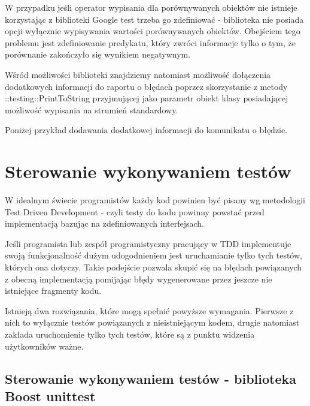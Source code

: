 \documentclass[12pt,a4paper,notitlepage]{report}
\begin{document}
W przypadku jeśli operator wypisania dla porównywanych obiektów nie istnieje korzystając z biblioteki Google test trzeba go zdefiniować - biblioteka nie posiada opcji wyłącznie wypisywania wartości porównywanych obiektów. Obejściem tego problemu jest zdefiniowanie predykatu, który zwróci informacje tylko o tym, że porównanie zakończyło się wynikiem negatywnym.

Wśród możliwości biblioteki znajdziemy natomiast możliwość dołączenia dodatkowych informacji do raportu o błędach poprzez skorzystanie z metody ::testing::PrintToString przyjmującej jako parametr obiekt klasy posiadającej możliwość wypisania na strumień standardowy.

Poniżej przykład dodawania dodatkowej informacji do komunikatu o błędzie.

			

\chapter{Sterowanie wykonywaniem testów}

W idealnym świecie programistów każdy kod powinien być pisany wg metodologii Test Driven Development - czyli testy do kodu powinny powstać przed implementacją bazując na zdefiniowanych interfejsach.

Jeśli programista lub zespół programistyczny pracujący w TDD implementuje swoją funkcjonalność dużym udogodnieniem jest uruchamianie tylko tych testów, których ona dotyczy. Takie podejście pozwala skupić się na błędach powiązanych z obecną implementacją pomijając błędy wygenerowane przez jeszcze nie istniejące fragmenty kodu.

Istnieją dwa rozwiązania, które mogą spełnić powyższe wymagania. Pierwsze z nich to wyłącznie testów powiązanych z nieistniejącym kodem, drugie natomiast zakłada uruchomienie tylko tych testów, które są z punktu widzenia użytkowników ważne.

\section{Sterowanie wykonywaniem testów - biblioteka Boost unittest}
\end{document}
